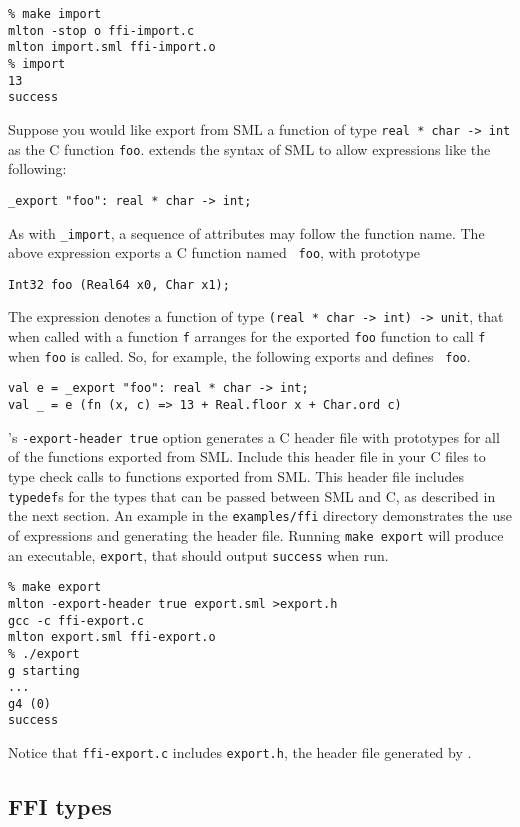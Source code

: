 \begin{verbatim}
% make import
mlton -stop o ffi-import.c
mlton import.sml ffi-import.o
% import
13
success
\end{verbatim}

Suppose you would like export from SML a function of type {\tt real *
char -> int} as the C function {\tt foo}.  {\mlton} extends the syntax
of SML to allow expressions like the following:
\begin{verbatim}
_export "foo": real * char -> int;
\end{verbatim}
As with {\tt \_import}, a sequence of attributes may follow the
function name.  The above expression exports a C function named {\tt
foo}, with prototype
\begin{verbatim}
Int32 foo (Real64 x0, Char x1);
\end{verbatim}
The {\export} expression denotes a function of type {\tt (real * char
-> int) -> unit}, that when called with a function {\tt f} arranges
for the exported {\tt foo} function to call {\tt f} when {\tt foo} is
called.  So, for example, the following exports and defines {\tt
foo}.
\begin{verbatim}
val e = _export "foo": real * char -> int;
val _ = e (fn (x, c) => 13 + Real.floor x + Char.ord c)
\end{verbatim}

{\mlton}'s {\tt -export-header true} option generates a C header file
with prototypes for all of the functions exported from SML.  Include
this header file in your C files to type check calls to functions
exported from SML.  This header file includes {\tt typedef}s for the
types that can be passed between SML and C, as described in the next
section.  An example in the {\tt examples/ffi} directory demonstrates
the use of {\export} expressions and generating the header file.
Running {\tt make export} will produce an executable, {\tt export},
that should output {\tt success} when run.

\begin{verbatim}
% make export
mlton -export-header true export.sml >export.h
gcc -c ffi-export.c
mlton export.sml ffi-export.o
% ./export
g starting
...
g4 (0)
success
\end{verbatim}
%
Notice that {\tt ffi-export.c} includes {\tt export.h}, the header
file generated by {\mlton}.
%
\subsection{FFI types}


